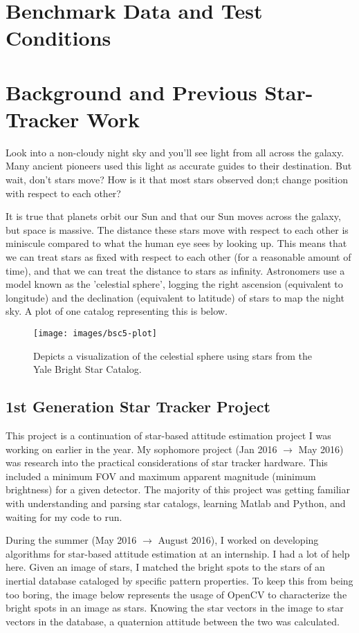 \section{Benchmark Data and Test Conditions}



\section{Background and Previous Star-Tracker Work}  Look into a
non-cloudy night sky and you'll see light from all across the galaxy. Many
ancient pioneers used this light as accurate guides to their destination. But
wait, don't stars move? How is it that most stars observed don;t change
position with respect to each other? \smallskip

It is
true that planets orbit our Sun and that our Sun moves across the galaxy, but
space is massive. The distance these stars move with respect to each other is
miniscule compared to what the human eye sees by looking up. This means that we
can treat stars as fixed with respect to each other (for a reasonable amount of
time), and that we can treat the distance to stars as infinity. Astronomers use
a model known as the 'celestial sphere', logging the right ascension (equivalent
to longitude) and the declination (equivalent to latitude) of stars to map the
night sky. A plot of one catalog representing this is below.

\begin{figure}[h!] \centering \texttt{[image: images/bsc5-plot]}
\caption{Depicts a visualization of the celestial sphere using stars from the
Yale Bright Star Catalog.} \end{figure}

\subsection{1st Generation Star Tracker Project}
This project is a continuation of star-based attitude estimation project I was
working on earlier in the year. My sophomore project (Jan 2016 $\rightarrow$ May
2016) was research into the practical considerations of star tracker hardware.
This included a minimum FOV and maximum apparent magnitude (minimum brightness)
for a given detector. The majority of this project was getting familiar with
understanding and parsing star catalogs, learning Matlab and Python, and waiting
for my code to run. \smallskip

During the summer (May 2016 $\rightarrow$ August 2016), I worked on developing
algorithms for star-based attitude estimation at an internship. I had a lot of
help here. Given an image of stars, I matched the bright spots to the stars of
an inertial database cataloged by specific pattern properties. To keep this
from being too boring, the image below represents the usage of OpenCV to
characterize the bright spots in an image as stars. Knowing the star vectors in
the image to star vectors in the database, a quaternion attitude between the two
was calculated.  \smallskip

